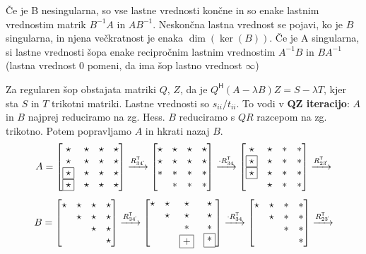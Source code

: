 \documentclass[a4paper,10pt]{article}
\theoremstyle{definition}
\newcommand{\T}{\mathsf{T}\!}
\renewcommand{\H}{\mathsf{H}\!}
\begin{document}
Če je B nesingularna, so vse lastne vrednosti končne in so enake lastnim
vrednostim matrik $B^{-1}A$ in $AB^{-1}$. Neskončna lastna vrednost se pojavi,
ko je $B$ singularna, in njena večkratnost je enaka $\dim(\ker(B))$.
Če je A singularna, si lastne vrednosti šopa enake recipročnim lastnim
vrednostim $A^{-1}B$ in $BA^{-1}$ (lastna vrednost 0 pomeni, da ima šop lastno
vrednost $\infty$)

Za regularen šop obstajata matriki $Q$, $Z$, da je $Q^\H(A-\lambda B)Z =
S-\lambda T$, kjer sta $S$ in $T$ trikotni matriki. Lastne vrednosti so
$s_{ii}/t_{ii}$. To vodi v \textbf{QZ iteracijo}:
$A$ in $B$ najprej reduciramo na zg. Hess. $B$ reduciramo s $QR$ razcepom na zg.
trikotno. Potem popravljamo $A$ in hkrati nazaj $B$.
\[
A = \begin{bmatrix}
  \star & \star & \star & \star \\
  \star & \star & \star & \star \\
  \framebox{$\star$} & \star & \star & \star \\
  \framebox{$\star$} & \star & \star & \star \\
\end{bmatrix}
\xrightarrow{R_{34}^\T\cdot}
\begin{bmatrix}
  \star & \star & \star & \star \\
  \star & \star & \star & \star \\
  * & * & * & * \\
            & * & * & * \\
\end{bmatrix}
\xrightarrow{\cdot R_{34}^\T}
\begin{bmatrix}
  \star & \star & * & * \\
  \framebox{$\star$} & \star & * & * \\
  \framebox{$\star$} & \star & * & * \\
        & \star & * & * \\
\end{bmatrix}
\xrightarrow{R_{23}^\T\cdot}
\]\[
B = \begin{bmatrix}
  \star & \star & \star & \star \\
        & \star & \star & \star \\
        &       & \star & \star \\
        &       &       & \star \\
\end{bmatrix}
\xrightarrow{R_{34}^\T\cdot}
\begin{bmatrix}
  \star & \star & \star & \star \\
        & \star & \star & \star \\
        &       & * & * \\
        &       & \framebox{+}  & \framebox{*} \\
\end{bmatrix}
\xrightarrow{\cdot R_{34}^\T}
\begin{bmatrix}
  \star & \star & * & * \\
        & \star & * & * \\
        &       & * & * \\
        &       &   & * \\
\end{bmatrix}
\xrightarrow{R_{23}^\T\cdot}
\]
\end{document}
